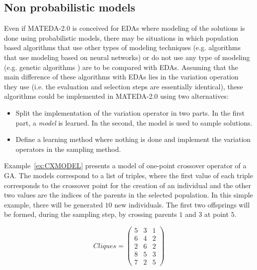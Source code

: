 \documentclass[a4paper]{article}
\begin{document}
\subsection{Non probabilistic models}

 Even if MATEDA-2.0 is conceived for EDAs where modeling of the
 solutions is done using probabilistic models, there may be
 situations in which population based algorithms that use other types of modeling
 techniques (e.g. algorithms  that use modeling based on neural networks)
 or do not use any type of modeling (e.g. genetic algorithms \cite{Goldberg:1989}) are to be compared with EDAs.
 Assuming that the main difference of these algorithms with EDAs lies in the variation operation they use
 (i.e. the evaluation and selection steps are essentially identical), these algorithms
 could be implemented in MATEDA-2.0 using two alternatives:

 \begin{itemize}
  \item Split the implementation of the variation operator in two
  parts. In the first part, a \emph{model} is learned. In the
  second,  the model is used to sample solutions.
  \item Define a learning method where nothing is done and implement
  the variation operators in the sampling method.
 \end{itemize}

 Example~\ref{ex:CXMODEL} presents a model of one-point crossover operator of a GA.
 The models correspond to a list of triples, where the first value
 of each triple corresponds to the crossover point for the creation
 of an individual and the other two values are the indices of the
 parents in the selected population. In this simple example, there will be
 generated $10$ new individuals. The first two offsprings will be formed, during the sampling
 step, by crossing parents $1$ and $3$ at point $5$.

\begin{example}
 \begin{equation}
Cliques =  \left (\begin{array}{ccc}
             5 & 3 & 1  \\
             6 & 4 & 2  \\
             2 & 6 & 2  \\
             8 & 5 & 3   \\
             7 & 2 & 5
           \end{array} \right )\label{eq:CX}
 \end{equation}
 \label{ex:CXMODEL} \end{example}
\end{document}
